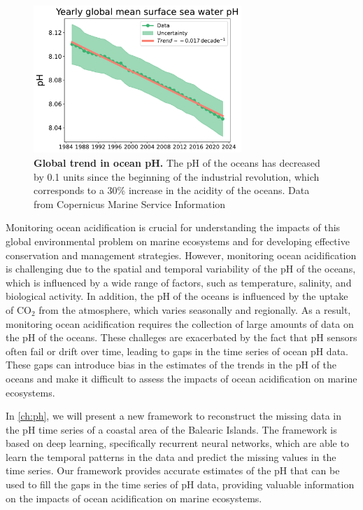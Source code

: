 \begin{figure}[H]
  \centering
  \includegraphics[width=0.7\textwidth]{Figures/Ocean_acidification.pdf}
  \caption[Global trend in ocean pH]{
    \textbf{Global trend in ocean pH.} The pH of the oceans has decreased by
    0.1 units since the beginning of the industrial revolution, which
    corresponds to a 30\% increase in the acidity of the oceans. Data from
    Copernicus Marine Service Information \cite{CMEMS2024}}
  \label{fig:Ocean_acidification}
\end{figure}

Monitoring ocean acidification is crucial for understanding the impacts of
this global environmental problem on marine ecosystems and for developing
effective conservation and management strategies. However, monitoring ocean
acidification is challenging due to the spatial and temporal variability of
the pH of the oceans, which is influenced by a wide range of factors, such as
temperature, salinity, and biological activity. In addition, the pH of the
oceans is influenced by the uptake of CO$_2$ from the atmosphere, which
varies seasonally and regionally. As a result, monitoring ocean acidification
requires the collection of large amounts of data on the pH of the oceans.
These challeges are exacerbated by the fact that pH sensors often fail or drift
over time, leading to gaps in the time series of ocean pH data. These gaps can
introduce bias in the estimates of the trends in the pH of the oceans and
make it difficult to assess the impacts of ocean acidification on marine
ecosystems.

In \cref{ch:ph}, we will present a new framework to reconstruct the missing
data in the pH time series of a coastal area of the Balearic Islands.
The framework is based on deep learning, specifically recurrent neural
networks, which are able to learn the temporal patterns in the data and predict
the missing values in the time series. Our framework provides accurate
estimates of the pH that can be used to fill the gaps in the time series of pH
data, providing valuable information on the impacts of ocean acidification on
marine ecosystems.